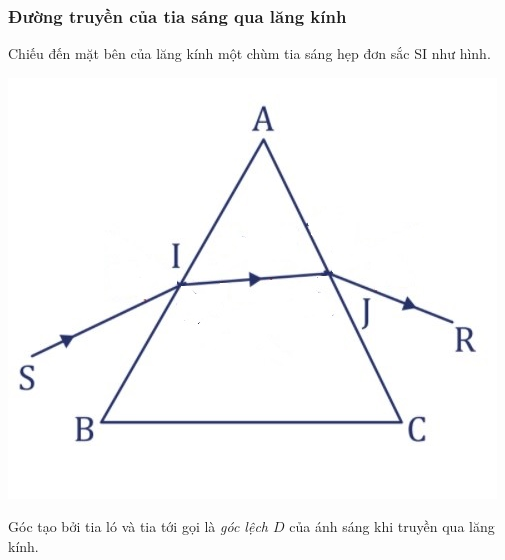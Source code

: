 \subsubsection{Đường truyền của tia sáng qua lăng kính}
Chiếu đến mặt bên của lăng kính một chùm tia sáng hẹp đơn sắc SI như hình.
\begin{center}
	\includegraphics[scale=0.5]{../figs/VN11-PH-37-L-025-1-h3.jpg}
\end{center}
	
Góc tạo bởi tia ló và tia tới gọi là \textit{góc lệch $D$} của ánh sáng khi truyền qua lăng kính. 

